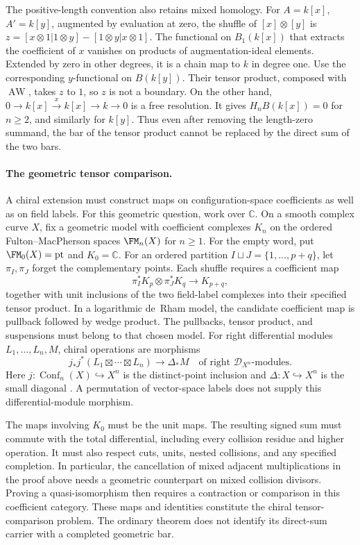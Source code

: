 The positive-length convention also retains mixed homology.
For $A=k[x]$, $A'=k[y]$, augmented by evaluation at zero,
the shuffle of $[x]\otimes[y]$ is
$z=[x\otimes1|1\otimes y]-[1\otimes y|x\otimes1]$.
The functional on $B_1(k[x])$ that extracts the coefficient of $x$
vanishes on products of augmentation-ideal elements. Extended by zero
in other degrees, it is a chain map to $k$ in degree one.
Use the corresponding $y$-functional on $B(k[y])$.
Their tensor product, composed with $\operatorname{AW}$, takes $z$
to $1$, so $z$ is not a boundary. On the other hand,
$0\to k[x]\xrightarrow{x}k[x]\to k\to0$ is a free resolution.
It gives $H_nB(k[x])=0$ for $n\geq2$, and similarly for $k[y]$.
Thus even after removing the length-zero summand, the bar of the
tensor product cannot be replaced by the direct sum of the two bars.

\paragraph{The geometric tensor comparison.}
A chiral extension must construct maps on configuration-space
coefficients as well as on field labels. For this geometric question,
work over $\mathbb C$. On a smooth complex curve
$X$, fix a geometric model with coefficient complexes $K_n$ on the
ordered Fulton--MacPherson spaces $\FM_n(X)$ for $n\geq1$.
For the empty word, put $\FM_0(X)=\mathrm{pt}$ and $K_0=\mathbb C$.
For an ordered partition
$I\sqcup J=\{1,\ldots,p+q\}$, let $\pi_I,\pi_J$ forget the
complementary points. Each shuffle requires a coefficient map
\[
 \pi_I^*K_p\otimes\pi_J^*K_q\longrightarrow K_{p+q},
\]
together with unit inclusions of the two field-label complexes into
their specified tensor product. In a logarithmic de~Rham model, the
candidate coefficient map is pullback followed by wedge product.
The pullbacks, tensor product, and suspensions must belong to that
chosen model. For right differential modules $L_1,\ldots,L_n,M$,
chiral operations are morphisms
\[
 j_*j^*(L_1\boxtimes\cdots\boxtimes L_n)\longrightarrow\Delta_*M
 \quad\text{of right $\mathcal D_{X^n}$-modules}.
\]
Here $j\colon\operatorname{Conf}_n(X)\hookrightarrow X^n$ is the
distinct-point inclusion and $\Delta\colon X\hookrightarrow X^n$
is the small diagonal
\cite[\S3.1.1--3.1.2]{BD04}. A permutation of vector-space labels
does not supply this differential-module morphism.

The maps involving $K_0$ must be the unit maps.
The resulting signed sum must commute with the total differential,
including every collision residue and higher operation. It must also
respect cuts, units, nested collisions, and any specified completion.
In particular, the cancellation of mixed adjacent multiplications in
the proof above needs a geometric counterpart on mixed collision
divisors. Proving a quasi-isomorphism then requires a contraction or
comparison in this coefficient category. These maps and identities
constitute the chiral tensor-comparison problem. The ordinary theorem
does not identify its direct-sum carrier with a completed geometric bar.

